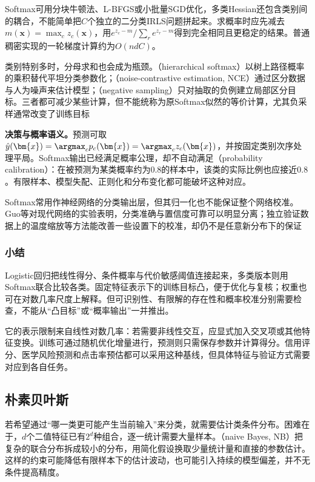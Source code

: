 Softmax可用分块牛顿法、L-BFGS或小批量SGD优化，多类Hessian还包含类别间的耦合，不能简单把$C$个独立的二分类IRLS问题拼起来。求概率时应先减去$m(\bm{x})=\max_c z_c(\bm{x})$，用$e^{z_c-m}/\sum_r e^{z_r-m}$得到完全相同且更稳定的结果。普通稠密实现的一轮梯度计算约为$O(ndC)$。

类别特别多时，分母求和也会成为瓶颈。（hierarchical softmax）以树上路径概率的乘积替代平坦分类参数化；（noise-contrastive estimation, NCE）通过区分数据与人为噪声来估计模型；（negative sampling）只对抽取的负例建立局部区分目标。三者都可减少某些计算，但不能统称为原Softmax似然的等价计算，尤其负采样通常改变了训练目标

\textbf{决策与概率语义。}预测可取$\hat y(\bm{x})=\argmax_c p_c(\bm{x})=\argmax_c z_c(\bm{x})$，并按固定类别次序处理平局。Softmax输出已经满足概率公理，却不自动满足（probability calibration）：在被预测为某类概率约为$0.8$的样本中，该类的实际比例也应接近$0.8$。有限样本、模型失配、正则化和分布变化都可能破坏这种对应。

Softmax常用作神经网络的分类输出层，但其归一化也不能保证整个网络校准。Guo等对现代网络的实验表明，分类准确与置信度可靠可以明显分离；独立验证数据上的温度缩放等方法能改善一些设置下的校准，却仍不是任意新分布下的保证

\subsubsection{小结}
\label{sec:classification-logistic-summary}

Logistic回归把线性得分、条件概率与代价敏感阈值连接起来，多类版本则用Softmax联合比较各类。固定特征表示下的训练目标凸，便于优化与复核；权重也可在对数几率尺度上解释。但可识别性、有限解的存在性和概率校准分别需要检查，不能从“凸目标”或“概率输出”一并推出。

它的表示限制来自线性对数几率：若需要非线性交互，应显式加入交叉项或其他特征变换。训练可通过随机优化增量进行，预测则只需保存参数并计算得分。信用评分、医学风险预测和点击率预估都可以采用这种基线，但具体特征与验证方式需要对应到各自任务。

\subsection{朴素贝叶斯}
\label{sec:classification-naive-bayes}

若希望通过“哪一类更可能产生当前输入”来分类，就需要估计类条件分布。困难在于，$d$个二值特征已有$2^d$种组合，逐一统计需要大量样本。（naive Bayes, NB）把复杂的联合分布拆成较小的分布，用简化假设换取少量统计量和直接的参数估计。这样的约束可能降低有限样本下的估计波动，也可能引入持续的模型偏差，并不无条件提高精度。

